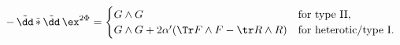 \begin{equation}
\label{HBI}
   - \,\tilde{\dd}\,\tilde{*}\,\tilde{\dd}\,\ex^{2\Phi} 
      = \begin{cases} 
            G \wedge G & \text{for type II}, \\
            G \wedge G + 2\alpha'(\Tr F\wedge F -\tr R\wedge R)& 
               \text{for heterotic/type I}. 
         \end{cases} 
\end{equation}

